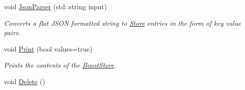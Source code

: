\begin{DoxyCompactItemize}
void \hyperlink{classBoostStore_a6380dcf800764516378adc5552f63114}{Json\-Parser} (std\-::string input)
\begin{DoxyCompactList}\small\item\em Converts a flat J\-S\-O\-N formatted string to \hyperlink{classStore}{Store} entries in the form of key value pairs. \end{DoxyCompactList}\item 
void \hyperlink{classBoostStore_ac88d4b1cd17889c85d4acfca3a2b2acc}{Print} (bool values=true)
\begin{DoxyCompactList}\small\item\em Prints the contents of the \hyperlink{classBoostStore}{Boost\-Store}. \end{DoxyCompactList}\item 
\hypertarget{classBoostStore_a99c755b996ad99c9d610dd48ffb78f17}{void \hyperlink{classBoostStore_a99c755b996ad99c9d610dd48ffb78f17}{Delete} ()}\label{classBoostStore_a99c755b996ad99c9d610dd48ffb78f17}


\end{DoxyCompactItemize}
